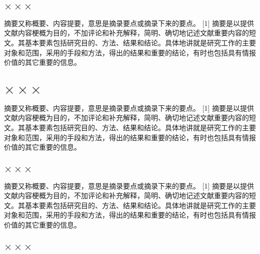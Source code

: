 \documentclass[12pt,oneside,a4paper,fleqn]{ctexart}
\begin{document}
\begin{spacing}{1.25}
\end{spacing}\vspace{0.5em} {\heiti \subsection{ $\times \times \times $}}\begin{spacing}{1.25}

摘要又称概要、内容提要，意思是摘录要点或摘录下来的要点。 [1]  摘要是以提供文献内容梗概为目的，不加评论和补充解释，简明、确切地记述文献重要内容的短文。其基本要素包括研究目的、方法、结果和结论。具体地讲就是研究工作的主要对象和范围，采用的手段和方法，得出的结果和重要的结论，有时也包括具有情报价值的其它重要的信息。

\end{spacing}\vspace{0.5em} {\heiti \section{ $\times \times \times $}} \vspace{0.5em}\begin{spacing}{1.25}

摘要又称概要、内容提要，意思是摘录要点或摘录下来的要点。 [1]  摘要是以提供文献内容梗概为目的，不加评论和补充解释，简明、确切地记述文献重要内容的短文。其基本要素包括研究目的、方法、结果和结论。具体地讲就是研究工作的主要对象和范围，采用的手段和方法，得出的结果和重要的结论，有时也包括具有情报价值的其它重要的信息。

\end{spacing}\vspace{0.5em} {\heiti \subsection{ $\times \times \times $}}\begin{spacing}{1.25}

摘要又称概要、内容提要，意思是摘录要点或摘录下来的要点。 [1]  摘要是以提供文献内容梗概为目的，不加评论和补充解释，简明、确切地记述文献重要内容的短文。其基本要素包括研究目的、方法、结果和结论。具体地讲就是研究工作的主要对象和范围，采用的手段和方法，得出的结果和重要的结论，有时也包括具有情报价值的其它重要的信息。



\end{spacing}\vspace{0.5em} {\heiti \subsection{ $\times \times \times $}}\begin{spacing}{1.25}


\end{spacing}
\end{document}
